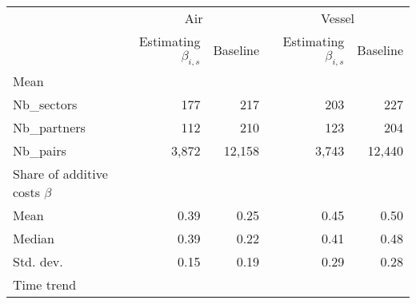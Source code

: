 \begin{tabular}{lllll}
\cline{1-5}
\multicolumn{1}{c}{} &
  \multicolumn{2}{|c}{Air} &
  \multicolumn{2}{c}{Vessel} \\
\multicolumn{1}{c}{} &
  \multicolumn{1}{|r}{Estimating $\beta_{i,s}$} &
  \multicolumn{1}{r}{Baseline} &
  \multicolumn{1}{r}{Estimating $\beta_{i,s}$} &
  \multicolumn{1}{r}{Baseline} \\ \hline
\cline{1-5}
\multicolumn{1}{l}{Mean} &
  \multicolumn{1}{|r}{} &
  \multicolumn{1}{r}{} &
  \multicolumn{1}{r}{} &
  \multicolumn{1}{r}{} \\
\multicolumn{1}{l}{\hspace{1em}Nb\_sectors} &
  \multicolumn{1}{|r}{177} &
  \multicolumn{1}{r}{217} &
  \multicolumn{1}{r}{203} &
  \multicolumn{1}{r}{227} \\
\multicolumn{1}{l}{\hspace{1em}Nb\_partners} &
  \multicolumn{1}{|r}{112} &
  \multicolumn{1}{r}{210} &
  \multicolumn{1}{r}{123} &
  \multicolumn{1}{r}{204} \\
\multicolumn{1}{l}{\hspace{1em}Nb\_pairs} &
  \multicolumn{1}{|r}{3,872} &
  \multicolumn{1}{r}{12,158} &
  \multicolumn{1}{r}{3,743} &
  \multicolumn{1}{r}{12,440} \\ \hline
\multicolumn{1}{l}{Share of additive costs $\beta$} &
  \multicolumn{1}{|r}{} &
  \multicolumn{1}{r}{} &
  \multicolumn{1}{r}{} &
  \multicolumn{1}{r}{} \\
\multicolumn{1}{l}{\hspace{1em}Mean} &
  \multicolumn{1}{|r}{0.39} &
  \multicolumn{1}{r}{0.25} &
  \multicolumn{1}{r}{0.45} &
  \multicolumn{1}{r}{0.50} \\
\multicolumn{1}{l}{\hspace{1em}Median} &
  \multicolumn{1}{|r}{0.39} &
  \multicolumn{1}{r}{0.22} &
  \multicolumn{1}{r}{0.41} &
  \multicolumn{1}{r}{0.48} \\
\multicolumn{1}{l}{\hspace{1em}Std. dev.} &
  \multicolumn{1}{|r}{0.15} &
  \multicolumn{1}{r}{0.19} &
  \multicolumn{1}{r}{0.29} &
  \multicolumn{1}{r}{0.28} \\
\multicolumn{1}{l}{Time trend} &
  \multicolumn{1}{|r}{} &
  \multicolumn{1}{r}{} &

\end{tabular}
